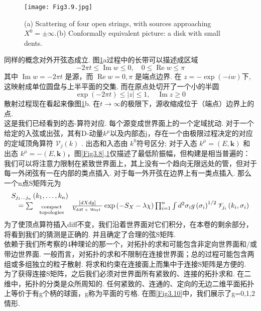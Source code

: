\begin{figure}
	\begin{center}
		\texttt{[image: Fig3.9.jpg]}\\
		\caption{(a) Scattering of four open strings, with sources approaching $X^{0}=\pm \infty$.(b) Conformally equivalent picture: a disk with small dents.}\label{Fig3.9}
	\end{center}
\end{figure}
同样的概念对外开弦态成立. 图\ref{Fig3.9}a过程中的长带可以描述成区域
\begin{equation}
-2 \pi t \leq \operatorname{Im} w \leq 0, \quad 0 \leq \operatorname{Re} w \leq \pi
\end{equation}
其中 $\operatorname{Im} w=-2 \pi t$ 是源，而 $\operatorname{Re} w=0, \pi$ 是端点边界. 在 $z=-\exp (-i w)$下, 这映射成单位圆盘与上半平面的交集. 而在原点处切开了一个小的半圆
\begin{equation}
\exp (-2 \pi t) \leq|z| \leq 1, \quad \operatorname{Im} z \geq 0
\end{equation}
散射过程现在看起来像图\ref{Fig3.9}b. 在$t \rightarrow \infty$的极限下，源收缩成位于（端点）边界上的点.\\
这是我们已经看到的态-算符对应. 每个源变成世界面上的一个定域扰动. 对于一个给定的入弦或出弦，其有D-动量$k^{\mu}$以及内部态j，存在一个由极限过程决定的对应的定域顶角算符 $\mathscr{V}_{j}(k)$ . 出态和入态由 $k^{0}$符号区分; 对于入态 $k^{\mu}=(E, \mathbf{k})$ 和出态 $k^{\mu}=-(E, \mathbf{k})$，图\ref{Fig3.8},\ref{Fig3.9}仅描述了最低阶振幅，但构建是相当普遍的：我们可以将注意力限制在紧致世界面上，其上没有一个趋向无限远处的管，但对于每一外闭弦有一在内部的类点插入. 对于每一外开弦在边界上有一类点插入. 那么一个n点S矩阵元为
\begin{equation}
\begin{array}{l}
S_{j_{1} \ldots j_{n}}\left(k_{1}, \ldots, k_{n}\right) \\
\quad=\sum_{\begin{array}{c}
	\text { compact } \atop \text { topologies }
	\end{array}} \frac{[d X d g]}{V_{\text {diff } \times \text { Weyl }}} \exp \left(-S_{X}-\lambda \chi\right) \prod_{i=1}^{n} \int d^{2} \sigma_{i} g\left(\sigma_{i}\right)^{1 / 2} \mathscr{V}_{j_{i}}\left(k_{i}, \sigma_{i}\right)
\end{array}
\end{equation}
为了使顶点算符插入diff不变，我们沿着世界面对它们积分，在本卷的剩余部分，将看到我们的猜测是正确的. 并且确定了合理的弦S矩阵. \\
依赖于我们所考察的4种理论的那一个，对拓扑的求和可能包含非定向世界面和/或带边世界面. 一般而言，对拓扑的求和不限制在连接世界面；总的过程可能包含两组或多组独立的粒子散射. 将求和约束在连接面上而集中于连接S矩阵是方便的. \\
为了获得连接S矩阵，之后我们必须对世界面所有紧致的、连接的拓扑求和. 在二维中，拓扑的分类是众所周知的. 任何紧致的、连通的、定向的无边二维平面拓扑上等价于有g个柄的球面，g称为平面的亏格. 在图\ref{Fig3.10}中，我们展示了g=0,1,2情形.

